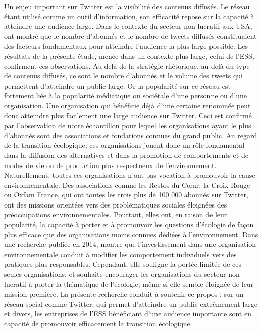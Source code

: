             Un enjeu important sur Twitter est la visibilité des contenus diffusés. Le réseau étant utilisé comme un outil d’information, son efficacité repose sur la capacité à atteindre une audience large. Dans le contexte du secteur non lucratif aux USA, \textcite{guo2017speaking} ont montré que le nombre d’abonnés et le nombre de tweets diffusés constituaient des facteurs fondamentaux pour atteindre l’audience la plus large possible. Les résultats de la présente étude, menée dans un contexte plus large, celui de l’ESS, confirment ces observations. Au-delà de la stratégie rhétorique, au-delà du type de contenus diffusés, ce sont le nombre d’abonnés et le volume des tweets qui permettent d’atteindre un public large. Or la popularité sur ce réseau est fortement liée à la popularité médiatique ou sociétale d’une personne ou d’une organisation. Une organisation qui bénéficie déjà d’une certaine renommée peut donc atteindre plus facilement une large audience sur Twitter. Ceci est confirmé par l’observation de notre échantillon pour lequel les organisations ayant le plus d’abonnés sont des associations et fondations connues du grand public. Au regard de la transition écologique, ces organisations jouent donc un rôle fondamental dans la diffusion des alternatives et dans la promotion de comportements et de modes de vie ou de production plus respectueux de l’environnement. Naturellement, toutes ces organisations n’ont pas vocation à promouvoir la cause environnementale. Des associations comme les Restos du Cœur, la Croix Rouge ou Oxfam France, qui ont toutes les trois plus de 100 000 abonnés sur Twitter, ont des missions orientées vers des problématiques sociales éloignées des préoccupations environnementales. Pourtant, elles ont, en raison de leur popularité, la capacité à porter et à promouvoir les questions d’écologie de façon plus efficace que des organisations moins connues dédiées à l’environnement. Dans une recherche publiée en 2014, \textcite{buchs2014role} montre que l’investissement dans une organisation environnementale conduit à modifier les comportement individuels vers des pratiques plus responsables. Cependant, elle souligne la portée limitée de ces seules organisations, et souhaite encourager les organisations du secteur non lucratif à porter la thématique de l’écologie, même si elle semble éloignée de leur mission première. La présente recherche conduit à soutenir ce propos : sur un réseau social comme Twitter, qui permet d’atteindre un public extrêmement large et divers, les entreprises de l’ESS bénéficiant d’une audience importante sont en capacité de promouvoir efficacement la transition écologique.   \\

